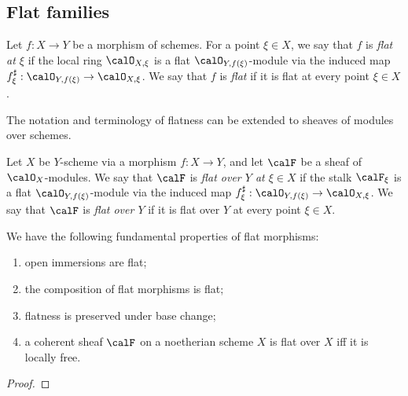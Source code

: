 \subsection{Flat families}

    \begin{definition}\label{def:flat_morphisms}
        Let \(f:X\to Y\) be a morphism of schemes. 
        For a point \(\xi \in X\), we say that \(f\) is \emph{flat at \(\xi\)} if the local ring \(\calO_{X,\xi}\) is a flat \(\calO_{Y,f(\xi)}\)-module via the induced map \(f^\sharp_\xi:\calO_{Y,f(\xi)}\to \calO_{X,\xi}\).
        We say that \(f\) is \emph{flat} if it is flat at every point \(\xi \in X\).
    \end{definition}

    The notation and terminology of flatness can be extended to sheaves of modules over schemes.

    \begin{definition}\label{def:flat_sheaves_over_base}
        Let \(X\) be \(Y\)-scheme via a morphism \(f:X\to Y\), and let \(\calF\) be a sheaf of \(\calO_X\)-modules.
        We say that \(\calF\) is \emph{flat over \(Y\) at \(\xi \in X\)} if the stalk \(\calF_\xi\) is a flat \(\calO_{Y,f(\xi)}\)-module via the induced map \(f^\sharp_\xi:\calO_{Y,f(\xi)}\to \calO_{X,\xi}\).
        We say that \(\calF\) is \emph{flat over \(Y\)} if it is flat over \(Y\) at every point \(\xi \in X\).
    \end{definition}

    \begin{proposition}\label{prop:fundamental_properties_of_flat_morphism}
        We have the following fundamental properties of flat morphisms:
        \begin{enumerate}
            \item open immersions are flat;
            \item the composition of flat morphisms is flat;
            \item flatness is preserved under base change;
            \item a coherent sheaf \(\calF\) on a noetherian scheme \(X\) is flat over \(X\) iff it is locally free.
        \end{enumerate}
    \end{proposition}
    \begin{proof}
    \end{proof}

